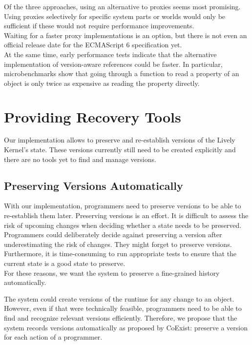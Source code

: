 Of the three approaches, using an alternative to proxies seems most promising.\\
Using proxies selectively for specific system parts or worlds would only be sufficient if these would not require performance improvements.\\
Waiting for a faster proxy implementations is an option, but there is not even an official release date for the ECMAScript 6 specification yet.\\
At the same time, early performance tests indicate that the alternative implementation of version-aware references could be faster.
In particular, microbenchmarks show that going through a function to read a property of an object is only twice as expensive as reading the property directly.


\section{Providing Recovery Tools}

Our implementation allows to preserve and re-establish versions of the Lively Kernel's state.
These versions currently still need to be created explicitly and there are no tools yet to find and manage versions.


\subsection{Preserving Versions Automatically}

With our implementation, programmers need to preserve versions to be able to re-establish them later.
Preserving versions is an effort.
It is difficult to assess the risk of upcoming changes when deciding whether a state needs to be preserved.
Programmers could deliberately decide against preserving a version after underestimating the risk of changes.
They might forget to preserve versions.
Furthermore, it is time-consuming to run appropriate tests to ensure that the current state is a good state to preserve.\\
For these reasons, we want the system to preserve a fine-grained history automatically.

The system could create versions of the runtime for any change to an object.
However, even if that were technically feasible, programmers need to be able to find and recognize relevant versions efficiently.
Therefore, we propose that the system records versions automatically as proposed by CoExist: preserve a version for each action of a programmer.

